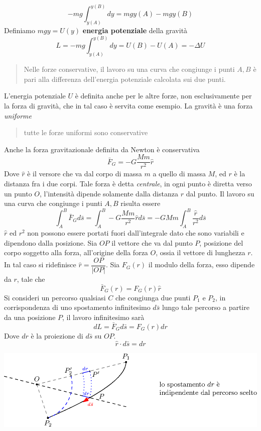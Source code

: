 \documentclass[10pt, letterpaper]{report}
\begin{document}
$$ -mg\int_{y(A)}^{y(B)}dy=mgy(A)-mgy(B)$$
Definiamo $mgy=U(y)$ \textbf{energia potenziale} della gravità
$$ L=-mg\int_{y(A)}^{y(B)}dy=U(B)-U(A)=-\Delta U$$
\begin{quote}
    Nelle forze conservative, il lavoro su una curva che congiunge i punti $A,B$ è pari alla differenza
     dell'energia potenziale calcolata sui due punti.
\end{quote}
L'energia potenziale $U$ è definita anche per le altre forze, non esclusivamente 
per la forza di gravità, che in tal caso è servita come esempio. La gravità 
è una forza \textit{uniforme}\begin{quote}
    tutte le forze uniformi sono conservative
\end{quote}
Anche la forza gravitazionale definita da Newton è conservativa 
$$ \bar F_G=-G\frac{Mm}{r^2}\hat r$$
Dove $\hat r$ è il versore che va dal corpo di massa $m$ a quello di massa $M$, ed $r$ è la distanza fra i due corpi. Tale 
forza è detta \textit{centrale}, in ogni punto è diretta verso un punto $O$, l'intensità dipende 
solamente dalla distanza $r$ dal punto. Il lavoro su una curva 
che congiunge i punti $A,B$ risulta essere 
$$ \int_A^B\bar F_Gd\bar s=\int_A^B-G\frac{Mm}{r^2}\hat rd\bar s=
-GMm\int_A^B\frac{\hat r}{r^2} d\bar s$$
$\hat r$ ed $r^2$ non possono essere portati fuori dall'integrale dato che sono variabili e dipendono dalla 
posizione. Sia $OP$ il vettore che va dal punto $P$, posizione del corpo soggetto alla forza, all'origine della forza $O$, ossia 
il vettore di lunghezza $r$. In tal caso si ridefinisce $\hat r = \dfrac{OP}{|OP|}$. \acc 
Sia $F_G(r)$ il modulo della forza, esso dipende da $r$, tale che 
$$ \bar F_G(r)=F_G(r)\hat r$$
Si consideri un percorso qualsiasi $C$ che congiunga due punti $P_1$ e $P_2$, in corrispondenza di uno 
spostamento infinitesimo $d\bar s$ lungo tale percorso a partire da una posizione $P$, 
il lavoro infinitesimo sarà 
$$ dL=\bar F_Gd\bar s = F_G(r)dr$$
Dove $dr$ è la proiezione di $d\bar s$ su $OP$. 
$$ \hat r \cdot d\bar s=dr$$ 
\begin{center}
    \includegraphics[width=1\textwidth]{images/forzaCentrale.eps}
\end{center}
\end{document}
